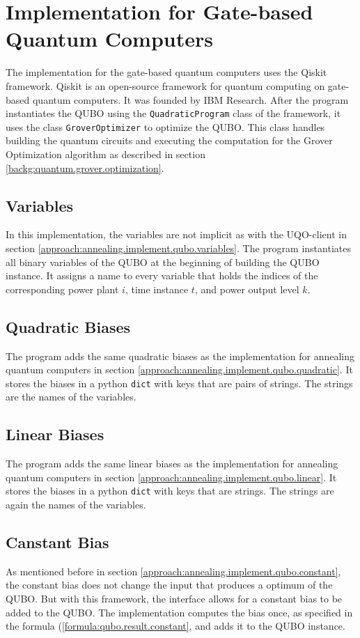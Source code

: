 \section{Implementation for Gate-based Quantum Computers}
\label{approach:gate.implement}

The implementation for the gate-based quantum computers uses the Qiskit framework.
Qiskit is an open-source framework for quantum computing on gate-based quantum computers.
It was founded by IBM Research.
\cite{QiskitWeb, QiskitGitHub}
After the program instantiates the QUBO using the \texttt{QuadraticProgram} class of the framework, it uses the class \texttt{GroverOptimizer} to optimize the QUBO.
This class handles building the quantum circuits and executing the computation for the Grover Optimization algorithm as described in section \ref{backg:quantum.grover.optimization}.

\subsection{Variables}

In this implementation, the variables are not implicit as with the UQO-client in section \ref{approach:annealing.implement.qubo.variables}.
The program instantiates all binary variables of the QUBO at the beginning of building the QUBO instance.
It assigns a name to every variable that holds the indices of the corresponding power plant $i$, time instance $t$, and power output level $k$.

\subsection{Quadratic Biases}

The program adds the same quadratic biases as the implementation for annealing quantum computers in section \ref{approach:annealing.implement.qubo.quadratic}.
It stores the biases in a python \texttt{dict} with keys that are pairs of strings.
The strings are the names of the variables.

\subsection{Linear Biases}

The program adds the same linear biases as the implementation for annealing quantum computers in section \ref{approach:annealing.implement.qubo.linear}.
It stores the biases in a python \texttt{dict} with keys that are strings.
The strings are again the names of the variables.

\subsection{Canstant Bias}

As mentioned before in section \ref{approach:annealing.implement.qubo.constant}, the constant bias does not change the input that produces a optimum of the QUBO.
But with this framework, the interface allows for a constant bias to be added to the QUBO.
The implementation computes the bias once, as specified in the formula (\ref{formula:qubo.result.constant}, and adds it to the QUBO instance.
